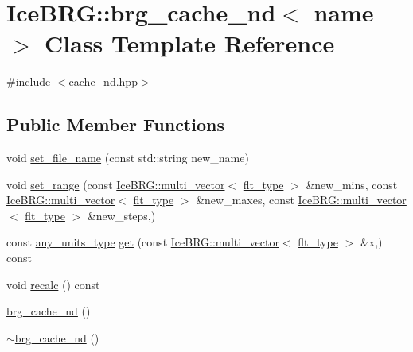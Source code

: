 \hypertarget{classIceBRG_1_1brg__cache__nd}{}\section{Ice\+B\+R\+G\+:\+:brg\+\_\+cache\+\_\+nd$<$ name $>$ Class Template Reference}
\label{classIceBRG_1_1brg__cache__nd}


{\ttfamily \#include $<$cache\+\_\+nd.\+hpp$>$}

\subsection*{Public Member Functions}
\begin{DoxyCompactItemize}
\item 
void \hyperlink{classIceBRG_1_1brg__cache__nd_a5b43eb5c8201bbfbc505ec3b1ff2aeec}{set\+\_\+file\+\_\+name} (const std\+::string new\+\_\+name)
\item 
void \hyperlink{classIceBRG_1_1brg__cache__nd_ac512caa8a339a6d2dcbbee63889af649}{set\+\_\+range} (const \hyperlink{classIceBRG_1_1multi__vector}{Ice\+B\+R\+G\+::multi\+\_\+vector}$<$ \hyperlink{lib_2IceBRG__main_2common_8h_ad0f130a56eeb944d9ef2692ee881ecc4}{flt\+\_\+type} $>$ \&new\+\_\+mins, const \hyperlink{classIceBRG_1_1multi__vector}{Ice\+B\+R\+G\+::multi\+\_\+vector}$<$ \hyperlink{lib_2IceBRG__main_2common_8h_ad0f130a56eeb944d9ef2692ee881ecc4}{flt\+\_\+type} $>$ \&new\+\_\+maxes, const \hyperlink{classIceBRG_1_1multi__vector}{Ice\+B\+R\+G\+::multi\+\_\+vector}$<$ \hyperlink{lib_2IceBRG__main_2common_8h_ad0f130a56eeb944d9ef2692ee881ecc4}{flt\+\_\+type} $>$ \&new\+\_\+steps,)
\item 
const \hyperlink{namespaceIceBRG_a3101fc159e191fa99c4ec14e445df96e}{any\+\_\+units\+\_\+type} \hyperlink{classIceBRG_1_1brg__cache__nd_a2a064a74a2521fad4b98ba26ccee7ca2}{get} (const \hyperlink{classIceBRG_1_1multi__vector}{Ice\+B\+R\+G\+::multi\+\_\+vector}$<$ \hyperlink{lib_2IceBRG__main_2common_8h_ad0f130a56eeb944d9ef2692ee881ecc4}{flt\+\_\+type} $>$ \&x,) const 
\item 
void \hyperlink{classIceBRG_1_1brg__cache__nd_a72a38d3e26f357a52e8c112eff4ed1a4}{recalc} () const 
\item 
\hyperlink{classIceBRG_1_1brg__cache__nd_a72ca34bfd8921763d25db0dacaf4b7d8}{brg\+\_\+cache\+\_\+nd} ()
\item 
\hyperlink{classIceBRG_1_1brg__cache__nd_ab571680706c24a8fb418463ba834aed1}{$\sim$brg\+\_\+cache\+\_\+nd} ()
\end{DoxyCompactItemize}
